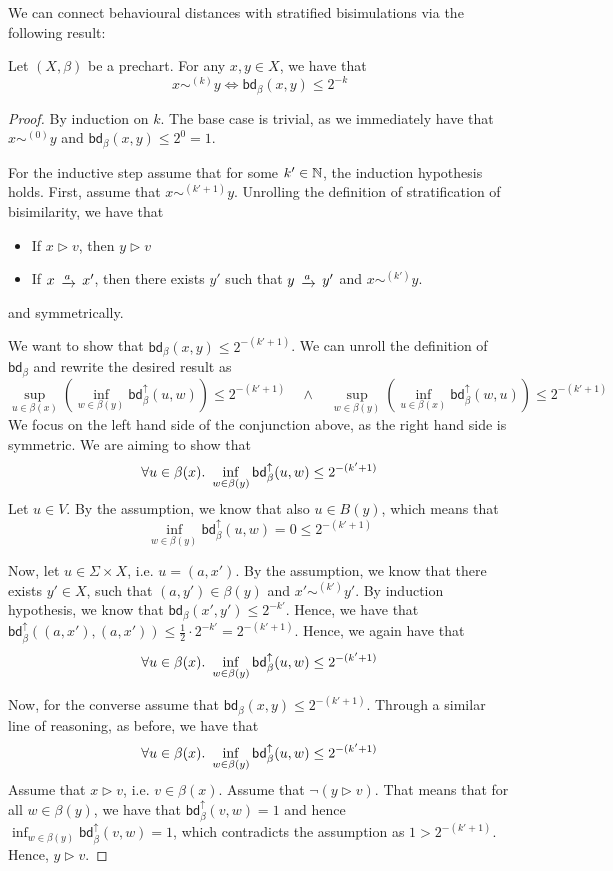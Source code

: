 We can connect behavioural distances with stratified bisimulations via the following result:
\begin{lemma}\label{lem:bound_on_stratified_bisim}
	Let $(X, \beta)$ be a prechart. For any $x,y \in X$, we have that 
	$$
	x \sim^{(k)} y \iff \mathsf{bd}_{\beta}(x,y) \leq 2^{-k}
	$$
\end{lemma}
\begin{proof}
	By induction on $k$. The base case is trivial, as we immediately have that $x \sim^{(0)} y$ and $\mathsf{bd}_\beta(x,y) \leq 2^{0} = 1$.
	
	For the inductive step assume that for some $k' \in \mathbb{N}$, the induction hypothesis holds. First, assume that $x \sim^{(k'+1)} y$. Unrolling the definition of stratification of bisimilarity, we have that
	\begin{itemize}
		\item If $x \rhd v$, then $y \rhd v$
		\item If $x \tr{a} x'$, then there exists $y'$ such that $y \tr{a} y'$ and $x \sim^{(k')} y$.
	\end{itemize}
	and symmetrically.
	
	We want to show that $\mathsf{bd}_\beta(x,y) \leq 2^{-(k'+1)}$. We can unroll the definition of $\mathsf{bd}_\beta$ and rewrite the desired result as
	$$
	\sup_{u \in \beta(x)} \left( \inf_{w \in \beta(y)} \mathsf{bd}_\beta^\uparrow(u,w)\right)  \leq 2^{-(k'+1)}\quad \wedge \quad \sup_{w \in \beta(y)} \left( \inf_{u \in \beta(x)} \mathsf{bd}_\beta^\uparrow(w,u)  \right)\leq 2^{-(k'+1)}
	$$
	We focus on the left hand side of the conjunction above, as the right hand side is symmetric. We are aiming to show that
	$$
	\forall {u \in \beta(x)}\ldotp~\inf_{w \in \beta(y)} \mathsf{bd}_\beta^\uparrow(u,w)  \leq 2^{-(k'+1)} 
	$$
	Let $u \in V$. By the assumption, we know that also $u \in B(y)$, which means that $$\inf_{w \in \beta(y)} \mathsf{bd}_\beta^\uparrow(u,w) = 0 \leq 2^{-(k'+1)}$$
	
	Now, let $u \in \Sigma \times X$, i.e. $u = (a,x')$. By the assumption, we know that there exists $y' \in X$, such that $(a,y') \in \beta(y)$ and $x' \sim^{(k')} y'$. By induction hypothesis, we know that $\mathsf{bd}_{\beta}(x',y') \leq 2^{-k'}$. Hence, we have that $\mathsf{bd}_{\beta}^\uparrow((a,x'),(a,x')) \leq \frac{1}{2} \cdot  2^{-k'} = 2^{-(k'+1)}$. Hence, we again have that 
		$$
		\forall {u \in \beta(x)}\ldotp~\inf_{w \in \beta(y)} \mathsf{bd}_\beta^\uparrow(u,w)  \leq 2^{-(k'+1)} 
		$$
		
		Now, for the converse assume that $\mathsf{bd}_\beta(x,y) \leq 2^{-(k'+1)}$. Through a similar line of reasoning, as before, we have that
		$$
		\forall{u \in \beta(x)}\ldotp~\inf_{w \in \beta(y)} \mathsf{bd}_\beta^\uparrow(u,w) \leq 2^{-(k'+1)} 
		$$
		Assume that $x \rhd v$, i.e. $v \in \beta(x)$. Assume that $\neg (y \rhd v)$. That means that for all $w \in \beta(y)$, we have that $\mathsf{bd}_\beta^\uparrow(v,w) = 1$ and hence $\inf_{w \in \beta(y)} \mathsf{bd}_\beta^\uparrow(v,w)=1$, which contradicts the assumption as $1>2^{-{(k'+1)}}$. Hence, $y \rhd v$.
		

\end{proof}
